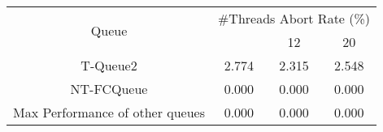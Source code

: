 \begin{tabular}{|c|c|c|c|}
\hline
\multirow{2}{*}{Queue} & \multicolumn{3}{c|}{\#Threads Abort Rate (\%)}\\\cline{2-4}& \quad 4 & 12 & 20\\
\hline
\hline
T-Queue2 & 2.774 & 2.315 & 2.548\\
NT-FCQueue & 0.000 & 0.000 & 0.000\\
Max Performance of other queues & 0.000 & 0.000 & 0.000\\
\hline\end{tabular}
